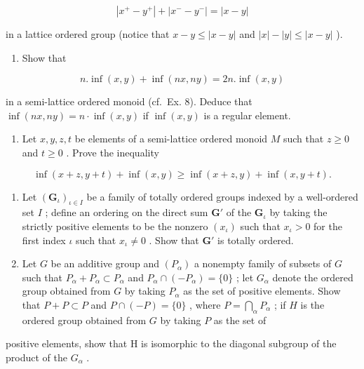 \[
\left| x ^ {+} - y ^ {+} \right| + \left| x ^ {-} - y ^ {-} \right| = | x - y |
\]

in a lattice ordered group (notice that \(x - y \leqslant |x - y|\) and \(|x| - |y| \leqslant |x - y|\) ).

\begin{enumerate}
\def\labelenumi{\arabic{enumi})}
\setcounter{enumi}{15}
\tightlist
\item
  Show that
\end{enumerate}

\[
n. \inf (x, y) + \inf (n x, n y) = 2 n. \inf (x, y)
\]

in a semi-lattice ordered monoid (cf.~Ex. 8). Deduce that \(\inf(nx, ny) = n \cdot \inf(x, y)\) if \(\inf(x, y)\) is a regular element.

\begin{enumerate}
\def\labelenumi{\arabic{enumi})}
\setcounter{enumi}{16}
\tightlist
\item
  Let \(x, y, z, t\) be elements of a semi-lattice ordered monoid \(M\) such that \(z \geqslant 0\) and \(t \geqslant 0\) . Prove the inequality
\end{enumerate}

\[
\inf (x + z, y + t) + \inf (x, y) \geqslant \inf (x + z, y) + \inf (x, y + t).
\]

\begin{enumerate}
\def\labelenumi{\arabic{enumi})}
\setcounter{enumi}{17}
\item
  Let \((\mathbf{G}_{\iota})_{\iota \in I}\) be a family of totally ordered groups indexed by a well-ordered set \(I\) ; define an ordering on the direct sum \(\mathbf{G}'\) of the \(\mathbf{G}_{\iota}\) by taking the strictly positive elements to be the nonzero \((x_{\iota})\) such that \(x_{\iota} > 0\) for the first index \(\iota\) such that \(x_{\iota} \neq 0\) . Show that \(\mathbf{G}'\) is totally ordered.
\item
  Let \(G\) be an additive group and \((P_{\alpha})\) a nonempty family of subsets of \(G\) such that \(P_{\alpha} + P_{\alpha} \subset P_{\alpha}\) and \(P_{\alpha} \cap (-P_{\alpha}) = \{0\}\) ; let \(G_{\alpha}\) denote the ordered group obtained from \(G\) by taking \(P_{\alpha}\) as the set of positive elements. Show that \(P + P \subset P\) and \(P \cap (-P) = \{0\}\) , where \(P = \bigcap_{\alpha} P_{\alpha}\) ; if \(H\) is the ordered group obtained from \(G\) by taking \(P\) as the set of
\end{enumerate}

positive elements, show that H is isomorphic to the diagonal subgroup of the product of the \(G_{\alpha}\) .


